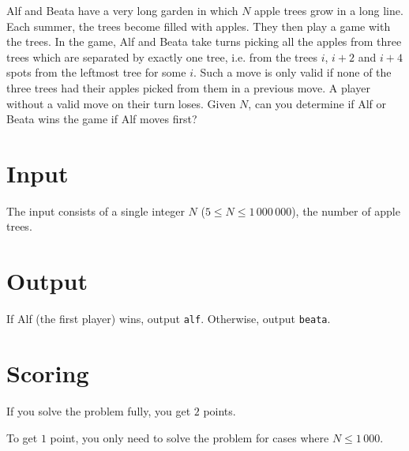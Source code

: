 Alf and Beata have a very long garden in which $N$ apple trees grow in a long line.
Each summer, the trees become filled with apples.
They then play a game with the trees.
In the game, Alf and Beata take turns picking all the apples from three trees which are separated by exactly one tree, i.e. from the trees $i$, $i + 2$ and $i + 4$ spots from the leftmost tree for some $i$.
Such a move is only valid if none of the three trees had their apples picked from them in a previous move.
A player without a valid move on their turn loses.
Given $N$, can you determine if Alf or Beata wins the game if Alf moves first?

\section*{Input}
The input consists of a single integer $N$ ($5 \le N \le 1\,000\,000$), the number of apple trees.

\section*{Output}
If Alf (the first player) wins, output \texttt{alf}.
Otherwise, output \texttt{beata}.

\section*{Scoring}
If you solve the problem fully, you get $2$ points.

To get $1$ point, you only need to solve the problem for cases where $N \le 1\,000$.
